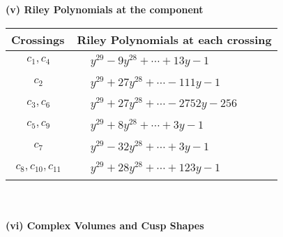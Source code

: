 \documentclass[1p]{elsarticle_modified}
\theoremstyle{definition}
\begin{document}
\newpage\renewcommand{\arraystretch}{1}
\flushleft \textbf{(v) Riley Polynomials at the component}\newline \\
\begin{tabular}{m{50pt}|m{274pt}}
Crossings & \hspace{64pt}Riley Polynomials at each crossing \\
\hline $$\begin{aligned}c_{1},c_{4}\end{aligned}$$&$\begin{aligned}
&y^{29}-9 y^{28}+\cdots+13 y-1
\end{aligned}$\\
\hline $$\begin{aligned}c_{2}\end{aligned}$$&$\begin{aligned}
&y^{29}+27 y^{28}+\cdots-111 y-1
\end{aligned}$\\
\hline $$\begin{aligned}c_{3},c_{6}\end{aligned}$$&$\begin{aligned}
&y^{29}+27 y^{28}+\cdots-2752 y-256
\end{aligned}$\\
\hline $$\begin{aligned}c_{5},c_{9}\end{aligned}$$&$\begin{aligned}
&y^{29}+8 y^{28}+\cdots+3 y-1
\end{aligned}$\\
\hline $$\begin{aligned}c_{7}\end{aligned}$$&$\begin{aligned}
&y^{29}-32 y^{28}+\cdots+3 y-1
\end{aligned}$\\
\hline $$\begin{aligned}c_{8},c_{10},c_{11}\end{aligned}$$&$\begin{aligned}
&y^{29}+28 y^{28}+\cdots+123 y-1
\end{aligned}$\\
\hline
\end{tabular}\\~\\
\newpage\flushleft \textbf{(vi) Complex Volumes and Cusp Shapes}
\end{document}
